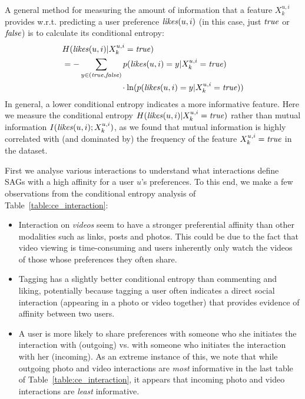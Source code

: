 A general method for measuring the amount of information that a 
feature $X^{u,i}_k$ provides w.r.t. predicting a user preference $\likes(u,i)$ (in this
case, just $\true$ or $\false$) is to calculate its conditional entropy:
\begin{align*}
&H(\likes(u,i) | X^{u,i}_k=\true)\\
& = -\sum_{y\in{(\true,\false)}} p(\likes(u,i)=y|X^{u,i}_k=\true) \\
& \qquad \qquad \qquad \;\;\;\; \cdot \ln( p(\likes(u,i)=y|X^{u,i}_k=\true))
\end{align*}
In general, a lower conditional entropy indicates a more informative
feature. Here we measure the conditional entropy $H(\likes(u,i)| X^{u,i}_k=\true)$
rather than mutual information $I(\likes(u,i); X^{u,i}_k)$, as we found 
that mutual information is highly correlated with (and dominated by) the 
frequency of the feature $X^{u,i}_k=\true$ in the dataset.

First we analyse various interactions to understand what
interactions define SAGs with a high affinity for a user $u$'s
preferences.  To this end, we make a few observations from the
conditional entropy analysis of Table~\ref{table:ce_interaction}:
\begin{itemize}
\item Interaction on {\em videos} seem to have a stronger preferential affinity 
than other modalities such as links, posts and photos.  This could be
  due to the fact that video viewing is time-consuming and users
  inherently only watch the videos of those whose preferences they
  often share.
\item Tagging has a slightly better conditional entropy than
  commenting and liking, potentially because tagging a user
  often indicates a direct social interaction (appearing in a photo
  or video together) that provides evidence of affinity between two
  users. 
\item A user is more likely to share preferences with someone who she
  initiates the interaction with (outgoing) vs. with someone who
  initiates the interaction with her (incoming).  As an extreme
  instance of this, we note that while outgoing photo and video
  interactions are \emph{most} informative in the last table of
  Table~\ref{table:ce_interaction}, it appears that incoming photo and
  video interactions are \emph{least} informative.
\end{itemize}

